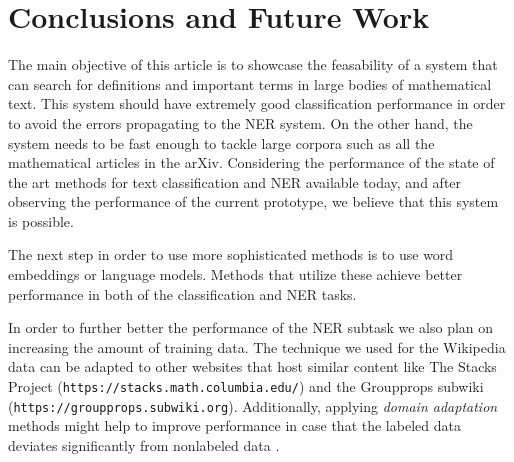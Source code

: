 \documentclass[a4paper]{easychair}
\begin{document}
\section{Conclusions and Future Work}
The main objective of this article is to showcase the feasability of a system that can search for definitions and important terms in large bodies of mathematical text. This system should have extremely good classification performance in order to avoid the errors propagating to the NER system. On the other hand, the system needs to be fast enough to tackle large corpora such as all the mathematical articles in the arXiv. Considering the performance of the state of the art methods for text classification and NER available today, and after observing the performance of the current prototype, we believe that this system is possible.

The next step in order to use more sophisticated methods is to use  word embeddings or language models. Methods that utilize these achieve better performance in both of the classification and NER tasks. 

In order to further better the performance of the NER subtask we also plan on increasing the amount of training data. The technique we used for the Wikipedia data can be adapted to other websites that host similar content like The Stacks Project (\texttt{https://stacks.math.columbia.edu/}) and the Groupprops subwiki (\texttt{https://groupprops.subwiki.org}). Additionally, applying  \emph{domain adaptation} methods might help to improve performance in case that the labeled data deviates significantly from nonlabeled data \cite{domainAdaptation}.




\end{document}
